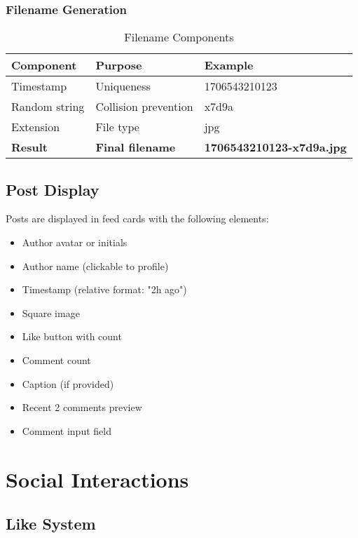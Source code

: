 \documentclass[12pt,a4paper]{report}
\begin{document}
\subsection{Filename Generation}

\begin{table}[H]
\centering
\caption{Filename Components}
\begin{tabular}{@{}lll@{}}
\toprule
\textbf{Component} & \textbf{Purpose} & \textbf{Example} \\ \midrule
Timestamp & Uniqueness & 1706543210123 \\
Random string & Collision prevention & x7d9a \\
Extension & File type & jpg \\
\textbf{Result} & \textbf{Final filename} & \textbf{1706543210123-x7d9a.jpg} \\ \bottomrule
\end{tabular}
\end{table}

\section{Post Display}

Posts are displayed in feed cards with the following elements:

\begin{itemize}
    \item Author avatar or initials
    \item Author name (clickable to profile)
    \item Timestamp (relative format: "2h ago")
    \item Square image
    \item Like button with count
    \item Comment count
    \item Caption (if provided)
    \item Recent 2 comments preview
    \item Comment input field
\end{itemize}

\chapter{Social Interactions}

\section{Like System}
\end{document}
